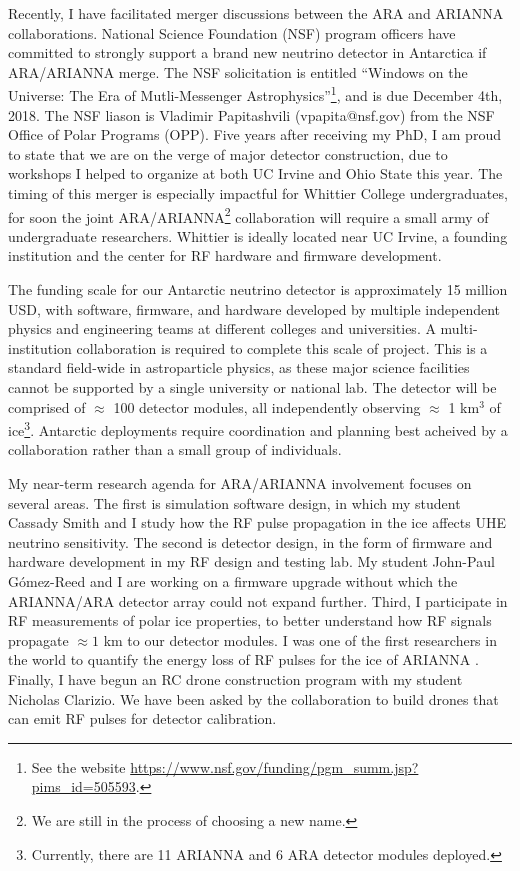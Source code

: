 \documentclass[../../main.tex]{subfiles}
\begin{document}
Recently, I have facilitated merger discussions between the ARA and ARIANNA collaborations.  National Science Foundation (NSF) program officers have committed to strongly support a brand new neutrino detector in Antarctica if ARA/ARIANNA merge.  The NSF solicitation is entitled ``Windows on the Universe: The Era of Mutli-Messenger Astrophysics''\footnote{See the website \url{https://www.nsf.gov/funding/pgm_summ.jsp?pims_id=505593}.}, and is due December 4th, 2018.  The NSF liason is Vladimir Papitashvili (vpapita@nsf.gov) from the NSF Office of Polar Programs (OPP).  Five years after receiving my PhD, I am proud to state that we are on the verge of major detector construction, due to workshops I helped to organize at both UC Irvine and Ohio State this year.  The timing of this merger is especially impactful for Whittier College undergraduates, for soon the joint ARA/ARIANNA\footnote{We are still in the process of choosing a new name.} collaboration will require a small army of undergraduate researchers. Whittier is ideally located near UC Irvine, a founding institution and the center for RF hardware and firmware development. \\ \hspace{0.1cm}

The funding scale for our Antarctic neutrino detector is approximately 15 million USD, with software, firmware, and hardware developed by multiple independent physics and engineering teams at different colleges and universities.  A multi-institution collaboration is required to complete this scale of project.  This is a standard field-wide in astroparticle physics, as these major science facilities cannot be supported by a single university or national lab.  The detector will be comprised of $\approx$ 100 detector modules, all independently observing $\approx$ 1 km$^3$ of ice\footnote{Currently, there are 11 ARIANNA and 6 ARA detector modules deployed.}.  Antarctic deployments require coordination and planning best acheived by a collaboration rather than a small group of individuals. \\ \hspace{0.1cm}

My near-term research agenda for ARA/ARIANNA involvement focuses on several areas.  The first is simulation software design, in which my student Cassady Smith and I study how the RF pulse propagation in the ice affects UHE neutrino sensitivity.  The second is detector design, in the form of firmware and hardware development in my RF design and testing lab.  My student John-Paul G\'{o}mez-Reed and I are working on a firmware upgrade without which the ARIANNA/ARA detector array could not expand further.  Third, I participate in RF measurements of polar ice properties, to better understand how RF signals propagate $\approx 1$ km to our detector modules.  I was one of the first researchers in the world to quantify the energy loss of RF pulses for the ice of ARIANNA \cite{hanson2015}. Finally, I have begun an RC drone construction program with my student Nicholas Clarizio.  We have been asked by the collaboration to build drones that can emit RF pulses for detector calibration.  \\ \hspace{0.1cm}
\end{document}
